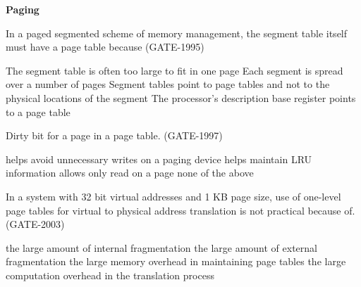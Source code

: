 
\centerline{\textbf{ \LARGE Paging}}


\begin{questyle}

  \question  In a paged segmented scheme of memory management, the segment table itself must have
             a page table because (GATE-1995)

  \begin{choices}
    \correctchoice The segment table is often too large to fit in one page
    \choice Each segment is spread over a number of pages
    \choice Segment tables point to page tables and not to the physical locations of the segment
    \choice The processor’s description base register points to a page table
  \end{choices}
\end{questyle}


\begin{questyle}

  \question Dirty bit for a page in a page table. (GATE-1997)

  \begin{choices}
    \choice helps avoid unnecessary writes on a paging device
    \choice helps maintain LRU information
    \choice allows only read on a page
    \choice none of the above
  \end{choices}
\end{questyle}



\begin{questyle}

  \question In a system with 32 bit virtual addresses and 1 KB page size, use of one-level page tables for virtual to
            physical address translation is not practical because of. (GATE-2003)

  \begin{choices}
    \choice the large amount of internal fragmentation
    \choice the large amount of external fragmentation
    \choice the large memory overhead in maintaining page tables
    \choice  the large computation overhead in the translation process
  \end{choices}

\end{questyle}

